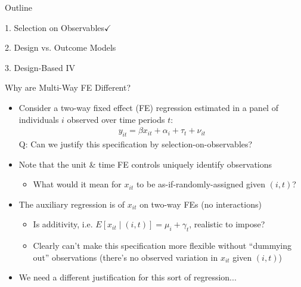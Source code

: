 \documentclass[11pt,english]{beamer}
\begin{document}
\begin{frame}{Outline}

\textcolor{red!75!green!50!blue!25!gray}{1. Selection on Observables}$\checkmark$
\vspace{0.8cm}

2. Design vs. Outcome Models
\vspace{0.8cm}

\textcolor{red!75!green!50!blue!25!gray}{3. Design-Based IV}

\end{frame}

\begin{frame}{Why are Multi-Way FE Different?}

\begin{itemize}
\item Consider a two-way fixed effect (FE) regression estimated in a panel of individuals $i$ observed over time periods $t$:
\begin{align*}
y_{it} = \beta x_{it} + \alpha_i + \tau_t + \nu_{it}
\end{align*}\pause{}
Q: Can we justify this specification by selection-on-observables? \bigskip\pause{}

\item Note that the unit \& time FE controls uniquely identify observations  \smallskip\pause{}
\begin{itemize}
\item What would it mean for $x_{it}$ to be as-if-randomly-assigned given $(i,t)$?
\end{itemize}\pause{}
\bigskip

\item The auxiliary regression is of $x_{it}$ on two-way FEs (no interactions)\smallskip
\begin{itemize}
\item Is additivity, i.e.   $E[x_{it}\mid (i,t)]=\mu_i + \gamma_t$, realistic to impose?\smallskip\pause{}
\item Clearly can't make this specification more flexible without ``dummying out'' observations (there's no observed variation in $x_{it}$ given $(i,t)$)
\end{itemize}\medskip\pause{}

\item We need a different justification for this sort of regression...

\end{itemize}


\end{frame}
\end{document}
